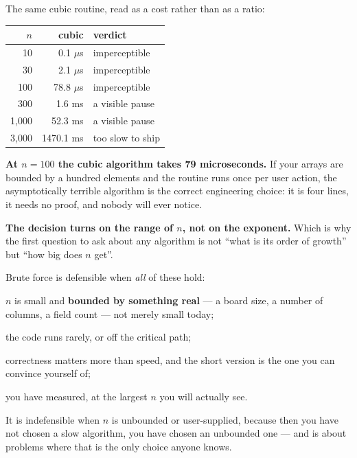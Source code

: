 \begin{worked}
The same cubic routine, read as a cost rather than as a ratio:

\begin{center}
\begin{tabular}{@{}rrl@{}}
\toprule
\rowcolor{primary!15}
$n$ & cubic & verdict \\
\midrule
   10 &    0.1 $\mu$s & imperceptible \\
   30 &    2.1 $\mu$s & imperceptible \\
  100 &   78.8 $\mu$s & imperceptible \\
  300 &    1.6 ms     & a visible pause \\
1{,}000 &   52.3 ms   & a visible pause \\
3{,}000 & 1470.1 ms   & too slow to ship \\
\bottomrule
\end{tabular}
\end{center}

\smallskip
\textbf{At $n = 100$ the cubic algorithm takes 79 microseconds.} If your arrays
are bounded by a hundred elements and the routine runs once per user action,
the asymptotically terrible algorithm is the correct engineering choice: it is
four lines, it needs no proof, and nobody will ever notice.

\smallskip
\textbf{The decision turns on the range of $n$, not on the exponent.} Which is
why the first question to ask about any algorithm is not ``what is its order of
growth'' but ``how big does $n$ get''.
\end{worked}

\begin{conceptbox}[A checklist]
Brute force is defensible when \emph{all} of these hold:

\begin{tight}
  \item $n$ is small and \textbf{bounded by something real} --- a board size, a
        number of columns, a field count --- not merely small today;
  \item the code runs rarely, or off the critical path;
  \item correctness matters more than speed, and the short version is the one
        you can convince yourself of;
  \item you have measured, at the largest $n$ you will actually see.
\end{tight}

\smallskip
It is indefensible when $n$ is unbounded or user-supplied, because then you
have not chosen a slow algorithm, you have chosen an unbounded one --- and
 is about problems where that is the only choice anyone
knows.
\end{conceptbox}

